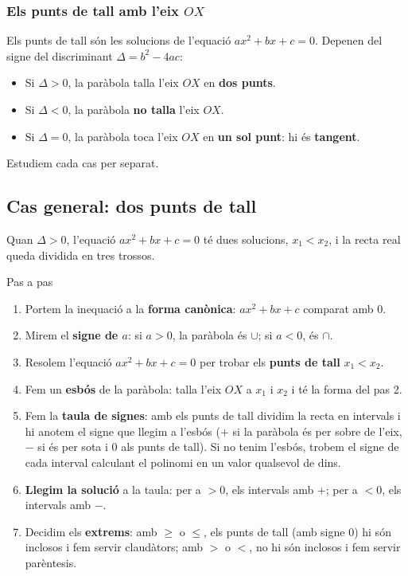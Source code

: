 \subsubsection{\texorpdfstring{Els punts de tall amb l'eix $OX$}{Els punts de tall amb l'eix OX}}

Els punts de tall són les solucions de l'equació $ax^2+bx+c=0$. Depenen del signe del discriminant $\Delta=b^2-4ac$:

\begin{itemize}
\item Si $\Delta>0$, la paràbola talla l'eix $OX$ en \textbf{dos punts}.
\item Si $\Delta<0$, la paràbola \textbf{no talla} l'eix $OX$.
\item Si $\Delta=0$, la paràbola toca l'eix $OX$ en \textbf{un sol punt}: hi és \textbf{tangent}.
\end{itemize}

Estudiem cada cas per separat.

\subsection{Cas general: dos punts de tall}

Quan $\Delta>0$, l'equació $ax^2+bx+c=0$ té dues solucions, $x_1<x_2$, i la recta real queda dividida en tres trossos.

\begin{definicio}{Pas a pas}
\begin{enumerate}
\item Portem la inequació a la \textbf{forma canònica}: $ax^2+bx+c$ comparat amb $0$.
\item Mirem el \textbf{signe de $a$}: si $a>0$, la paràbola és $\cup$; si $a<0$, és $\cap$.
\item Resolem l'equació $ax^2+bx+c=0$ per trobar els \textbf{punts de tall} $x_1<x_2$.
\item Fem un \textbf{esbós} de la paràbola: talla l'eix $OX$ a $x_1$ i $x_2$ i té la forma del pas 2.
\item Fem la \textbf{taula de signes}: amb els punts de tall dividim la recta en intervals i hi anotem el signe que llegim a l'esbós ($+$ si la paràbola és per sobre de l'eix, $-$ si és per sota i $0$ als punts de tall). Si no tenim l'esbós, trobem el signe de cada interval calculant el polinomi en un valor qualsevol de dins.
\item \textbf{Llegim la solució} a la taula: per a $>0$, els intervals amb $+$; per a $<0$, els intervals amb $-$.
\item Decidim els \textbf{extrems}: amb $\geq$ o $\leq$, els punts de tall (amb signe $0$) hi són inclosos i fem servir claudàtors; amb $>$ o $<$, no hi són inclosos i fem servir parèntesis.
\end{enumerate}
\end{definicio}

